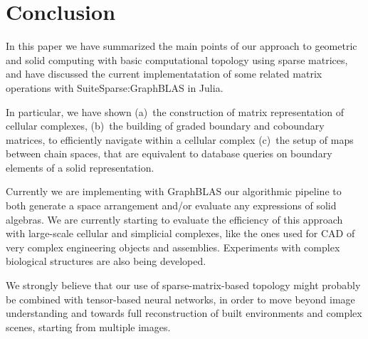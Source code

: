 \section{Conclusion}\label{conclusion}

In this paper we have summarized the main points of our approach to geometric and solid computing with basic computational topology using sparse matrices, and have discussed the current implementatation of some related  matrix operations with SuiteSparse:GraphBLAS in Julia.  

In particular, we have shown (a)~the construction of matrix  representation of cellular complexes, (b)~the building of graded boundary and coboundary matrices, to efficiently navigate within a cellular complex (c)~the setup of maps between chain spaces, that are equivalent to database queries on boundary elements of a solid representation. 

Currently we are implementing with GraphBLAS our algorithmic pipeline to both generate a space arrangement and/or evaluate any expressions of solid algebras. We are currently starting to evaluate the efficiency of this approach with large-scale cellular and simplicial complexes, like the ones used for CAD of very complex engineering objects and assemblies. Experiments with complex biological structures are also being developed. 

We strongly believe that our use of sparse-matrix-based topology  might probably be combined with tensor-based neural networks, in order to move beyond image understanding and towards full reconstruction of built environments and complex scenes, starting from multiple images.
